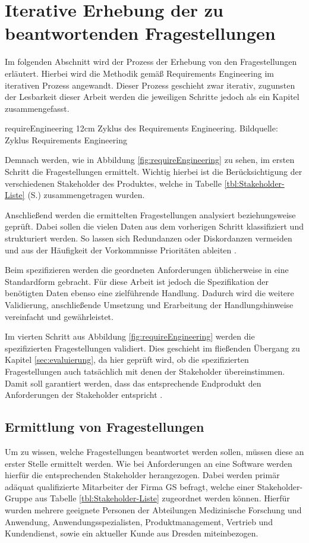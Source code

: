 \section{Iterative Erhebung der zu beantwortenden Fragestellungen}
\label{sec:erhebung}
Im folgenden Abschnitt wird der Prozess der Erhebung von den Fragestellungen erläutert.
Hierbei wird die Methodik gemäß Requirements Engineering \cite{Pohl.2011} im iterativen Prozess angewandt.
Dieser Prozess geschieht zwar iterativ, zugunsten der Lesbarkeit dieser Arbeit werden die jeweiligen Schritte jedoch als ein Kapitel zusammengefasst.

\bild
{requireEngineering}
{12cm}
{Zyklus des Requirements Engineering. Bildquelle: \cite{Patig.}}
{Zyklus Requirements Engineering}

Demnach werden, wie in Abbildung \ref{fig:requireEngineering} zu sehen, im ersten Schritt die Fragestellungen ermittelt.
Wichtig hierbei ist die Berücksichtigung der verschiedenen Stakeholder des Produktes, welche in Tabelle \ref{tbl:Stakeholder-Liste} (S.\pageref{tbl:Stakeholder-Liste}) zusammengetragen wurden.

Anschließend werden die ermittelten Fragestellungen analysiert beziehungsweise geprüft.
Dabei sollen die vielen Daten aus dem vorherigen Schritt klassifiziert und strukturiert werden.
So lassen sich Redundanzen oder Diskordanzen vermeiden und aus der Häufigkeit der Vorkommnisse Prioritäten ableiten \cite[S.100f]{Sommerville.2012}.

Beim spezifizieren werden die geordneten Anforderungen üblicherweise in eine Standardform gebracht.
Für diese Arbeit ist jedoch die Spezifikation der benötigten Daten ebenso eine zielführende Handlung.
Dadurch wird die weitere Validierung, anschließende Umsetzung und Erarbeitung der Handlungshinweise vereinfacht und gewährleistet.

Im vierten Schritt aus Abbildung \ref{fig:requireEngineering} werden die spezifizierten Fragestellungen validiert.
Dies geschieht im fließenden Übergang zu Kapitel \ref{sec:evaluierung}, da hier geprüft wird, ob die spezifizierten Fragestellungen auch tatsächlich mit denen der Stakeholder übereinstimmen.
Damit soll garantiert werden, dass das entsprechende Endprodukt den Anforderungen der Stakeholder entspricht \cite{Patig.}.


\subsection{Ermittlung von Fragestellungen}
Um zu wissen, welche Fragestellungen beantwortet werden sollen, müssen diese an erster Stelle ermittelt werden.
Wie bei Anforderungen an eine Software werden hierfür die entsprechenden Stakeholder herangezogen.
Dabei werden primär adäquat qualifizierte Mitarbeiter der Firma \gls{GS} befragt, welche einer Stakeholder-Gruppe aus Tabelle \ref{tbl:Stakeholder-Liste} zugeordnet werden können.
Hierfür wurden mehrere geeignete Personen der Abteilungen \glqq Medizinische Forschung und Anwendung\grqq, Anwendungsspezialisten, Produktmanagement, Vertrieb und Kundendienst, sowie ein aktueller Kunde aus Dresden miteinbezogen. %

